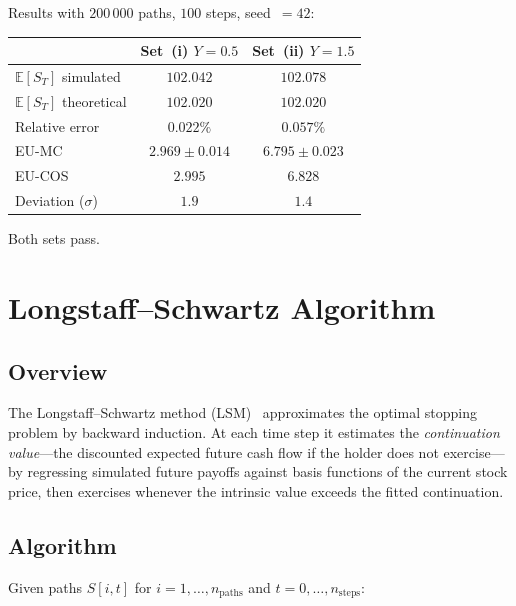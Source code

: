 \documentclass[11pt,a4paper]{article}
\newcommand{\E}{\mathbb{E}}
\begin{document}
Results with $200\,000$ paths, $100$ steps, seed~$= 42$:
\begin{center}
\begin{tabular}{lcc}
\toprule
 & Set~(i) $Y=0.5$ & Set~(ii) $Y=1.5$ \\
\midrule
$\E[S_T]$ simulated & $102.042$ & $102.078$ \\
$\E[S_T]$ theoretical & $102.020$ & $102.020$ \\
Relative error & $0.022\%$ & $0.057\%$ \\
EU-MC & $2.969 \pm 0.014$ & $6.795 \pm 0.023$ \\
EU-COS & $2.995$ & $6.828$ \\
Deviation ($\sigma$) & $1.9$ & $1.4$ \\
\bottomrule
\end{tabular}
\end{center}
Both sets pass.

\section{Longstaff--Schwartz Algorithm}

\subsection{Overview}

The Longstaff--Schwartz method (LSM)~\cite{LS2001} approximates the optimal
stopping problem by backward induction.  At each time step it estimates the
\emph{continuation value}---the discounted expected future cash flow if the
holder does not exercise---by regressing simulated future payoffs against basis
functions of the current stock price, then exercises whenever the intrinsic
value exceeds the fitted continuation.

\subsection{Algorithm}

Given paths $S[i, t]$ for $i = 1,\ldots,n_{\mathrm{paths}}$ and
$t = 0,\ldots,n_{\mathrm{steps}}$:
\end{document}
